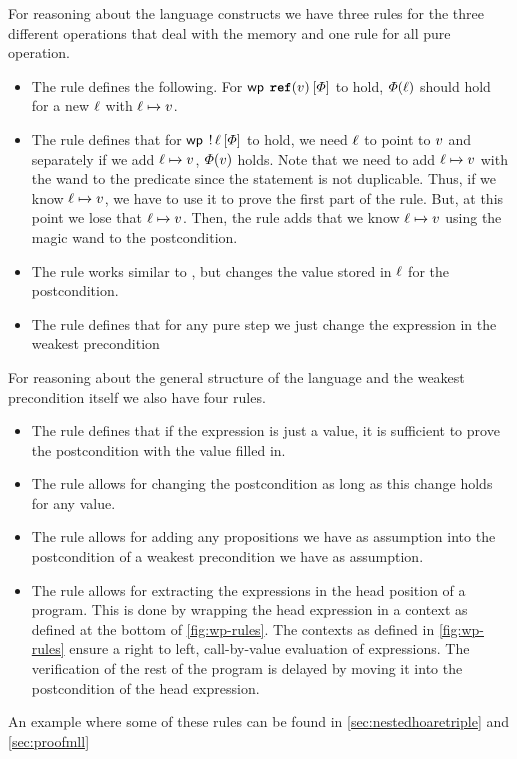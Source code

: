 \documentclass[thesis.tex]{subfiles}
\begin{document}
For reasoning about the language constructs we have three rules for the three different operations that deal with the memory and one rule for all pure operation.
\begin{itemize}
  \item The rule  defines the following. For $\wpre{\Alloc(\val)}{\pred}$ to hold, $\varPhi(\ell)$ should hold for a new $\ell$ with $\loc\fmapsto\val$.
  \item The rule  defines that for $\wpre{\deref \loc}{\pred}$ to hold, we need $\ell$ to point to $v$ and separately if we add $\loc\fmapsto\val$, $\varPhi(v)$ holds. Note that we need to add $\loc\fmapsto\val$ with the wand to the predicate since the statement is not duplicable. Thus, if we know $\loc\fmapsto\val$, we have to use it to prove the first part of the  rule. But, at this point we lose that $\loc\fmapsto\val$. Then, the  rule adds that we know $\loc\fmapsto\val$ using the magic wand to the postcondition.
  \item The rule  works similar to , but changes the value stored in $\ell$ for the postcondition.
  \item The rule  defines that for any pure step we just change the expression in the weakest precondition
\end{itemize}
For reasoning about the general structure of the language and the weakest precondition itself we also have four rules.
\begin{itemize}
  \item The rule  defines that if the expression is just a value, it is sufficient to prove the postcondition with the value filled in.
  \item The rule  allows for changing the postcondition as long as this change holds for any value.
  \item The rule  allows for adding any propositions we have as assumption into the postcondition of a weakest precondition we have as assumption.
  \item The rule  allows for extracting the expressions in the head position of a program. This is done by wrapping the head expression in a context as defined at the bottom of \cref*{fig:wp-rules}. The contexts as defined in \cref*{fig:wp-rules} ensure a right to left, call-by-value evaluation of expressions. The verification of the rest of the program is delayed by moving it into the postcondition of the head expression.
\end{itemize}
An example where some of these rules can be found in \cref*{sec:nestedhoaretriple} and \cref*{sec:proofmll}
\end{document}
